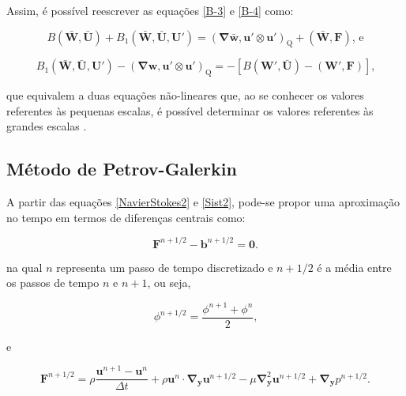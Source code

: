 \documentclass[_ArquivoPrincipal.tex]{subfiles}
\begin{document}
Assim, é possível reescrever as equações \ref{B-3} e \ref{B-4} como:

\begin{equation}
    B(\bar{\mathbf{W}},\bar{\mathbf{U}})+B_1(\bar{\mathbf{W}},\bar{\mathbf{U}},\mathbf{U}')=(\mathbf{\nabla}\bar{\mathbf{w}},\mathbf{u}'\otimes\mathbf{u}')_\mathrm{Q}+(\bar{\mathbf{W}},\mathbf{F})\text{, e}
    \label{B-6}
\end{equation}

\begin{equation}
    B_1(\bar{\mathbf{W}},\bar{\mathbf{U}},\mathbf{U}')-(\mathbf{\nabla}\mathbf{w},\mathbf{u}'\otimes\mathbf{u}')_\mathrm{Q}=-[B(\mathbf{W}',\bar{\mathbf{U}})-(\mathbf{W}',\mathbf{F})]\text{,}
    \label{B-7}
\end{equation}

\noindent que equivalem a duas equações não-lineares que, ao se conhecer os valores referentes às pequenas escalas, é possível determinar os valores referentes às grandes escalas \cite{hughes2002variational}.

\subsection{Método de Petrov-Galerkin} \label{MPG}

A partir das equações \ref{NavierStokes2} e \ref{Sist2}, pode-se propor uma aproximação no tempo em termos de diferenças centrais como:

\begin{equation}
    \mathbf{F}^{n+1/2}-\mathbf{b}^{n+1/2}=\mathbf{0}\text{.}
    \label{TimeApprox}
\end{equation}

\noindent na qual $n$ representa um passo de tempo discretizado e $n+1/2$ é a média entre os passos de tempo $n$ e $n+1$, ou seja,

\begin{equation}
    \phi^{n+1/2}=\frac{\phi^{n+1}+\phi^n}{2}\text{,}
    \label{MedTempo}
\end{equation}

\noindent e

\begin{equation}
    \mathbf{F}^{n+1/2}=\rho\frac{\mathbf{u}^{n+1}-\mathbf{u}^n}{\Delta t}+\rho\mathbf{u}^n\cdot\mathbf{\nabla}_\mathbf{y}\mathbf{u}^{n+1/2}-\mu\mathbf{\nabla}_\mathbf{y}^2\mathbf{u}^{n+1/2}+\mathbf{\nabla}_\mathbf{y}p^{n+1/2}\text{.}
    \label{FTimeApprox}
\end{equation}
\end{document}
